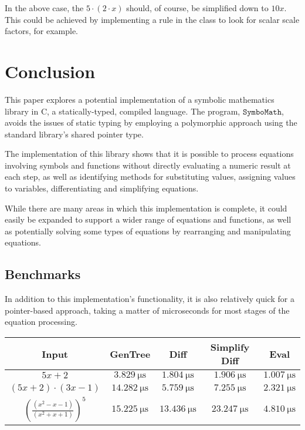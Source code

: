 \documentclass[12pt]{article}
\def\CC{{C\nolinebreak[4]\hspace{-.05em}\raisebox{.4ex}{\tiny\bf ++ }}}
\def\Symbo{{$\texttt{SymboMath}$}}
\begin{document}
In the above case, the $5\cdot(2\cdot x)$ should, of course, be simplified down to $10x$. This could be achieved by implementing a rule in the  class to look for scalar scale factors, for example.

\pagebreak

\section{Conclusion}

This paper explores a potential implementation of a symbolic mathematics library in \CC, a statically-typed, compiled language. The program, \Symbo, avoids the issues of static typing by employing a polymorphic approach using the standard library's shared pointer type.

The implementation of this library shows that it is possible to process equations involving symbols and functions without directly evaluating a numeric result at each step, as well as identifying methods for substituting values, assigning values to variables, differentiating and simplifying equations.

While there are many areas in which this implementation is complete, it could easily be expanded to support a wider range of equations and functions, as well as potentially solving some types of equations by rearranging and manipulating equations.

\subsection{Benchmarks}

In addition to this implementation's functionality, it is also relatively quick for a pointer-based approach, taking a matter of microseconds for most stages of the equation processing.

\vspace{0.25cm}

\begin{center}
\begin{tabular}{||c c c c c||} 
 \hline
 Input & GenTree & Diff & Simplify Diff & Eval\\ [0.5ex] 
 \hline\hline
 $5x + 2$ & $\SI{3.829}{\micro\second}$ & $\SI{1.804}{\micro\second}$ & $\SI{1.906}{\micro\second}$ & $\SI{1.007}{\micro\second}$ \\ 
 \hline
 $(5x + 2) \cdot (3x - 1)$ & $\SI{14.282}{\micro\second}$ & $\SI{5.759}{\micro\second}$ & $\SI{7.255}{\micro\second}$ & $\SI{2.321}{\micro\second}$ \\ 
 \hline
 $\left( \frac{(x^2 - x - 1)}{(x^2 + x + 1)} \right)^5$ & $\SI{15.225}{\micro\second}$ & $\SI{13.436}{\micro\second}$ & $\SI{23.247}{\micro\second}$ & $\SI{4.810}{\micro\second}$ \\   [1ex] 
 \hline
\end{tabular}
\end{center}
\end{document}
